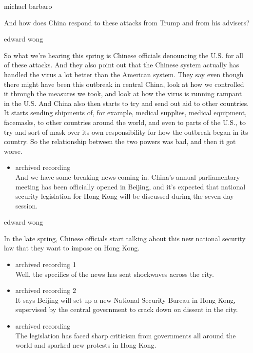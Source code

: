 michael barbaro

And how does China respond to these attacks from Trump and from his
advisers?

edward wong

So what we're hearing this spring is Chinese officials denouncing the
U.S. for all of these attacks. And they also point out that the Chinese
system actually has handled the virus a lot better than the American
system. They say even though there might have been this outbreak in
central China, look at how we controlled it through the measures we
took, and look at how the virus is running rampant in the U.S. And China
also then starts to try and send out aid to other countries. It starts
sending shipments of, for example, medical supplies, medical equipment,
facemasks, to other countries around the world, and even to parts of the
U.S., to try and sort of mask over its own responsibility for how the
outbreak began in its country. So the relationship between the two
powers was bad, and then it got worse.

\begin{itemize}
\tightlist
\item
  archived recording\\
  And we have some breaking news coming in. China's annual parliamentary
  meeting has been officially opened in Beijing, and it's expected that
  national security legislation for Hong Kong will be discussed during
  the seven-day session.
\end{itemize}

edward wong

In the late spring, Chinese officials start talking about this new
national security law that they want to impose on Hong Kong.

\begin{itemize}
\item
  archived recording 1\\
  Well, the specifics of the news has sent shockwaves across the city.
\item
  archived recording 2\\
  It says Beijing will set up a new National Security Bureau in Hong
  Kong, supervised by the central government to crack down on dissent in
  the city.
\item
  archived recording\\
  The legislation has faced sharp criticism from governments all around
  the world and sparked new protests in Hong Kong.
\end{itemize}

